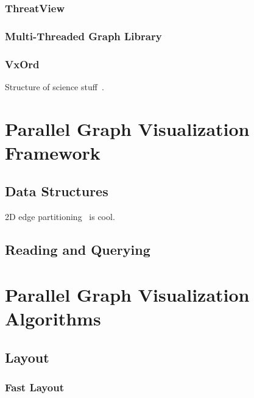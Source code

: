 \documentclass[pdf,12pt,report,strict]{SANDreport}
\newcommand*{\lcite}[1]{~\cite{#1}}
\newcommand{\threatview}{ThreatView\texttrademark\xspace}
\begin{document}
\subsection{\threatview}
\label{sec:RelatedProjects:ThreatView}

\subsection{Multi-Threaded Graph Library}
\label{sec:RelatedProjects:MTGL}

\subsection{VxOrd}
\label{sec:RelatedProjects:VxOrd}

Structure of science stuff\lcite{Boyak04,Boyak05}.


\chapter{Parallel Graph Visualization Framework}
\label{sec:ParallelGraphVisualizationFramework}

\section{Data Structures}
\label{sec:ParallelGraphVisualizationFramework:DataStructures}

2D edge partitioning\lcite{Yoo05} is cool.

\section{Reading and Querying}
\label{sec:ParallelGraphVisualizationFramework:ReadingAndQuerying}


\chapter{Parallel Graph Visualization Algorithms}
\label{chap:ParallelGraphVisualizationAlgorithms}

\section{Layout}
\label{sec:ParallelGraphVisualizationAlgorithms:Layout}

\subsection{Fast Layout}
\label{sec:ParallelGraphVisualizationAlgorithms:Layout:FastLayout}
\end{document}
